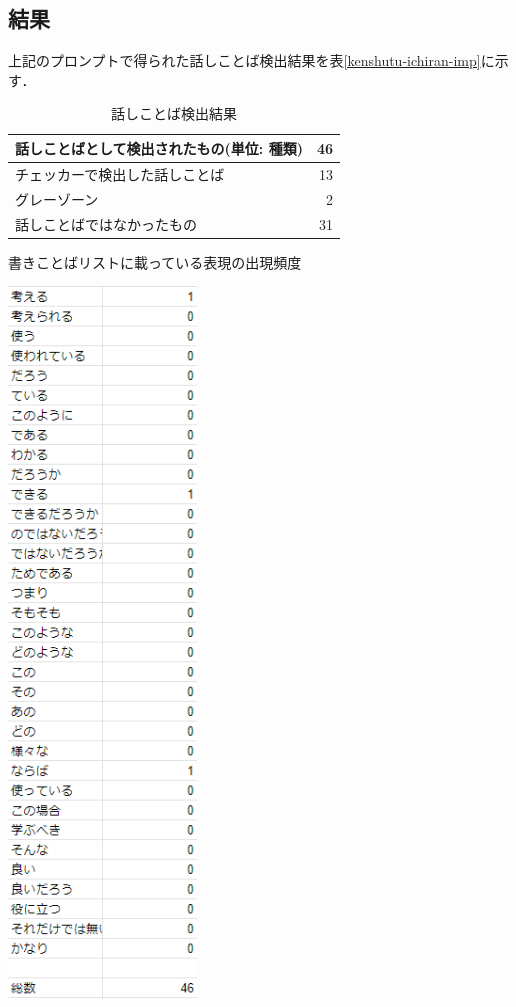 

\subsection{結果}
上記のプロンプトで得られた話しことば検出結果を表\ref{kenshutu-ichiran-imp}に示す．

\begin{table}[H]
\centering
\caption{話しことば検出結果}
\label{result-checker-klist2times}
\begin{tabular}{|l|r|}
\hline
話しことばとして検出されたもの(単位: 種類) & 46 \\ \hline
チェッカーで検出した話しことば & 13 \\ \hline
グレーゾーン & 2 \\ \hline
話しことばではなかったもの & 31 \\ \hline
\end{tabular}
\end{table} %

\begin{table}[H]
	\centering
        \caption{書きことばリストに載っている表現の出現頻度}
 	\includegraphics[width=50mm]{image/kenshutu-ichiran-imp.png}
	\label{kenshutu-ichiran-imp}
\end{table}

